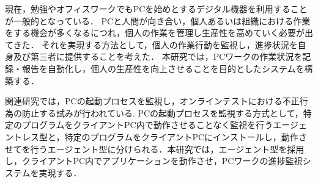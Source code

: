 現在，勉強やオフィスワークでもPCを始めとするデジタル機器を利用することが一般的となっている．
PCと人間が向き合い，個人あるいは組織における作業をする機会が多くなるにつれ，個人の作業を管理し生産性を高めていく必要が出てきた．
それを実現する方法として，個人の作業行動を監視し，進捗状況を自身及び第三者に提供することを考えた．
本研究では，PCワークの作業状況を記録・報告を自動化し，個人の生産性を向上させることを目的としたシステムを構築する．

関連研究では，PCの起動プロセスを監視し，オンラインテストにおける不正行為の防止する試みが行われている.
PCの起動プロセスを監視する方式として，特定のプログラムをクライアントPC内で動作させることなく監視を行うエージェントレス型と，特定のプログラムをクライアントPCにインストールし，動作させてを行うエージェント型に分けられる．本研究では，エージェント型を採用し，クライアントPC内でアプリケーションを動作させ，PCワークの進捗監視システムを実現する．
